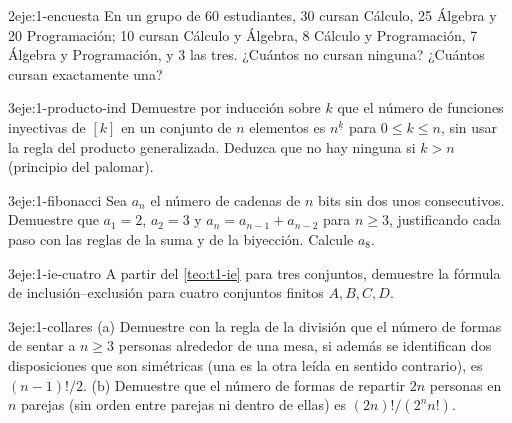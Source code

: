 \begin{ejercicio}{2}{eje:1-encuesta}
En un grupo de 60 estudiantes, 30 cursan Cálculo, 25 Álgebra y 20 Programación; 10 cursan Cálculo y Álgebra, 8 Cálculo y Programación, 7 Álgebra y Programación, y 3 las tres. ¿Cuántos no cursan ninguna? ¿Cuántos cursan exactamente una?
\end{ejercicio}

\begin{ejercicio}{3}{eje:1-producto-ind}
Demuestre por inducción sobre $k$ que el número de funciones inyectivas de $[k]$ en un conjunto de $n$ elementos es $n^{\underline{k}}$ para $0\le k\le n$, sin usar la regla del producto generalizada. Deduzca que no hay ninguna si $k>n$ (principio del palomar).
\end{ejercicio}

\begin{ejercicio}{3}{eje:1-fibonacci}
Sea $a_n$ el número de cadenas de $n$ bits sin dos unos consecutivos. Demuestre que $a_1=2$, $a_2=3$ y $a_n=a_{n-1}+a_{n-2}$ para $n\ge3$, justificando cada paso con las reglas de la suma y de la biyección. Calcule $a_8$.
\end{ejercicio}

\begin{ejercicio}{3}{eje:1-ie-cuatro}
A partir del \cref{teo:t1-ie} para tres conjuntos, demuestre la fórmula de inclusión--exclusión para cuatro conjuntos finitos $A,B,C,D$.
\end{ejercicio}

\begin{ejercicio}{3}{eje:1-collares}
(a) Demuestre con la regla de la división que el número de formas de sentar a $n\ge3$ personas alrededor de una mesa, si además se identifican dos disposiciones que son simétricas (una es la otra leída en sentido contrario), es $(n-1)!/2$. (b) Demuestre que el número de formas de repartir $2n$ personas en $n$ parejas (sin orden entre parejas ni dentro de ellas) es $(2n)!/(2^{n}n!)$.
\end{ejercicio}
